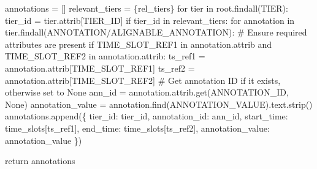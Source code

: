 \documentclass[
  letterpaper,
  DIV=11,
  numbers=noendperiod]{scrreprt}
\newenvironment{Shaded}{\begin{snugshade}}{\end{snugshade}}
\newcommand{\CommentTok}[1]{\textcolor[rgb]{0.37,0.37,0.37}{#1}}
\newcommand{\ControlFlowTok}[1]{\textcolor[rgb]{0.00,0.23,0.31}{#1}}
\newcommand{\KeywordTok}[1]{\textcolor[rgb]{0.00,0.23,0.31}{#1}}
\newcommand{\NormalTok}[1]{\textcolor[rgb]{0.00,0.23,0.31}{#1}}
\newcommand{\OperatorTok}[1]{\textcolor[rgb]{0.37,0.37,0.37}{#1}}
\newcommand{\StringTok}[1]{\textcolor[rgb]{0.13,0.47,0.30}{#1}}
\newcommand{\VariableTok}[1]{\textcolor[rgb]{0.07,0.07,0.07}{#1}}
\begin{document}
\begin{Shaded}
\begin{Highlighting}[]
\NormalTok{    annotations }\OperatorTok{=}\NormalTok{ []}
\NormalTok{    relevant\_tiers }\OperatorTok{=}\NormalTok{ \{rel\_tiers\}}
    \ControlFlowTok{for}\NormalTok{ tier }\KeywordTok{in}\NormalTok{ root.findall(}\StringTok{\textquotesingle{}TIER\textquotesingle{}}\NormalTok{):}
\NormalTok{        tier\_id }\OperatorTok{=}\NormalTok{ tier.attrib[}\StringTok{\textquotesingle{}TIER\_ID\textquotesingle{}}\NormalTok{]}
        \ControlFlowTok{if}\NormalTok{ tier\_id }\KeywordTok{in}\NormalTok{ relevant\_tiers:}
            \ControlFlowTok{for}\NormalTok{ annotation }\KeywordTok{in}\NormalTok{ tier.findall(}\StringTok{\textquotesingle{}ANNOTATION/ALIGNABLE\_ANNOTATION\textquotesingle{}}\NormalTok{):}
                \CommentTok{\# Ensure required attributes are present}
                \ControlFlowTok{if} \StringTok{\textquotesingle{}TIME\_SLOT\_REF1\textquotesingle{}} \KeywordTok{in}\NormalTok{ annotation.attrib }\KeywordTok{and} \StringTok{\textquotesingle{}TIME\_SLOT\_REF2\textquotesingle{}} \KeywordTok{in}\NormalTok{ annotation.attrib:}
\NormalTok{                    ts\_ref1 }\OperatorTok{=}\NormalTok{ annotation.attrib[}\StringTok{\textquotesingle{}TIME\_SLOT\_REF1\textquotesingle{}}\NormalTok{]}
\NormalTok{                    ts\_ref2 }\OperatorTok{=}\NormalTok{ annotation.attrib[}\StringTok{\textquotesingle{}TIME\_SLOT\_REF2\textquotesingle{}}\NormalTok{]}
                    \CommentTok{\# Get annotation ID if it exists, otherwise set to None}
\NormalTok{                    ann\_id }\OperatorTok{=}\NormalTok{ annotation.attrib.get(}\StringTok{\textquotesingle{}ANNOTATION\_ID\textquotesingle{}}\NormalTok{, }\VariableTok{None}\NormalTok{)}
\NormalTok{                    annotation\_value }\OperatorTok{=}\NormalTok{ annotation.find(}\StringTok{\textquotesingle{}ANNOTATION\_VALUE\textquotesingle{}}\NormalTok{).text.strip()}
\NormalTok{                    annotations.append(\{}
                        \StringTok{\textquotesingle{}tier\_id\textquotesingle{}}\NormalTok{: tier\_id,}
                        \StringTok{\textquotesingle{}annotation\_id\textquotesingle{}}\NormalTok{: ann\_id,}
                        \StringTok{\textquotesingle{}start\_time\textquotesingle{}}\NormalTok{: time\_slots[ts\_ref1],}
                        \StringTok{\textquotesingle{}end\_time\textquotesingle{}}\NormalTok{: time\_slots[ts\_ref2],}
                        \StringTok{\textquotesingle{}annotation\_value\textquotesingle{}}\NormalTok{: annotation\_value}
\NormalTok{                    \})}

    \ControlFlowTok{return}\NormalTok{ annotations}


\end{Highlighting}
\end{Shaded}
\end{document}
